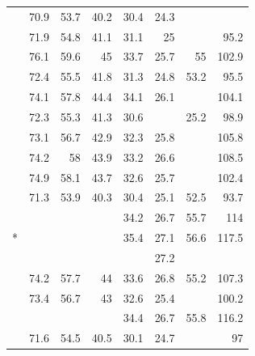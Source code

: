 \begin{table}[ht]
\begin{tabular}{lcrrrrrr}
    \citet{You2016}    &    70.9    &    53.7    &    40.2    &    30.4    &    24.3    &        &        \\
    \citet{Chen2017_SCA}    &    71.9    &    54.8    &    41.1    &    31.1    &    25    &        &    95.2    \\
    \citet{Chen2017_RLSTM}    &    76.1    &    59.6    &    45    &    33.7    &    25.7    &    55    &    102.9    \\
    \citet{Fu2017}    &    72.4    &    55.5    &    41.8    &    31.3    &    24.8    &    53.2    &    95.5    \\
    \citet{Gan2017_SCN}    &    74.1    &    57.8    &    44.4    &    34.1    &    26.1    &        &    104.1    \\
    \citet{Gu2017}    &    72.3    &    55.3    &    41.3    &    30.6    &        &    25.2    &    98.9    \\
    \citet{Liu2017_MAT}    &    73.1    &    56.7    &    42.9    &    32.3    &    25.8    &        &    105.8    \\
    \citet{Lu2017}    &    74.2    &    58    &    43.9    &    33.2    &    26.6    &        &    108.5    \\
    \citet{Mun2017}    &    74.9    &    58.1    &    43.7    &    32.6    &    25.7    &        &    102.4    \\
    \citet{Ren2017}    &    71.3    &    53.9    &    40.3    &    30.4    &    25.1    &    52.5    &    93.7    \\
    \citet{Rennie2017}     &        &        &        &    34.2    &    26.7    &    55.7    &    114    \\
    \citet{Rennie2017}*    &        &        &        &    35.4    &    27.1    &    56.6    &    117.5    \\
    \citet{Shetty2017}    &        &        &        &        &    27.2    &        &        \\
    \citet{Wang2017}    &    74.2    &    57.7    &    44    &    33.6    &    26.8    &    55.2    &    107.3    \\
    \citet{Yao2017_Attr}    &    73.4    &    56.7    &    43    &    32.6    &    25.4    &        &    100.2    \\
    \citet{Zhang2017}    &        &        &        &    34.4    &    26.7    &    55.8    &    116.2    \\
    \citet{Zhou2017}    &    71.6    &    54.5    &    40.5    &    30.1    &    24.7    &        &    97    \\

\end{tabular}
\end{table}
